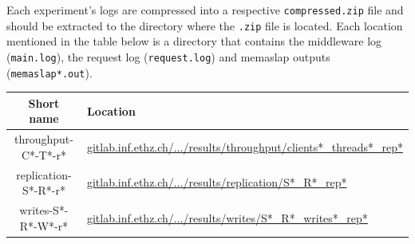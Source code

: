 \documentclass[11pt]{article}
\begin{document}
Each experiment's logs are compressed into a respective \verb+compressed.zip+ file and should be extracted to the directory where the \verb+.zip+ file is located. Each location mentioned in the table below is a directory that contains the middleware log (\verb+main.log+), the request log (\verb+request.log+) and memaslap outputs (\verb+memaslap*.out+). \\

\begin{tabular}{|c|l|}
\hline \textbf{Short name}& \textbf{Location} \\ 
\hline throughput-C*-T*-r* & \href{https://gitlab.inf.ethz.ch/pungast/asl-fall16-project/blob/master/results/throughput}{gitlab.inf.ethz.ch/.../results/throughput/clients*\_threads*\_rep*} \\ 
\hline replication-S*-R*-r* & \href{https://gitlab.inf.ethz.ch/pungast/asl-fall16-project/blob/master/results/replication}{gitlab.inf.ethz.ch/.../results/replication/S*\_R*\_rep*} \\ 
\hline writes-S*-R*-W*-r* & \href{https://gitlab.inf.ethz.ch/pungast/asl-fall16-project/blob/master/results/writes}{gitlab.inf.ethz.ch/.../results/writes/S*\_R*\_writes*\_rep*} \\ 
\hline 
\end{tabular} 
 
\end{document}
